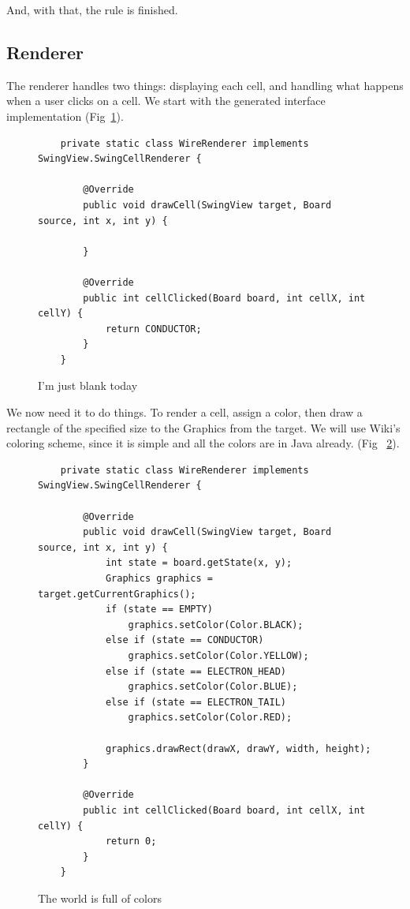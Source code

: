 \documentclass{report}
\begin{document}
And, with that, the rule is finished.


\subsection{Renderer}
The renderer handles two things: displaying each cell, and handling what happens
when a user clicks on a cell. We start with the generated interface
implementation  (Fig~\ref{code:blank}).
\begin{figure}[H]
\begin{lstlisting}
	private static class WireRenderer implements SwingView.SwingCellRenderer {

        @Override
        public void drawCell(SwingView target, Board source, int x, int y) {
        
        }

        @Override
        public int cellClicked(Board board, int cellX, int cellY) {
            return CONDUCTOR;
        }
    }
    \end{lstlisting}
\caption{I'm just blank today}
\label{code:blank}
\end{figure}


We now need it to do things.  To render a cell, assign a color, then draw a
rectangle of the specified size to the Graphics from the target. We will use Wiki's coloring scheme, since it is
simple and all the colors are in Java already. (Fig
~\ref{code:colored}).
\begin{figure}[H]
\begin{lstlisting}
	private static class WireRenderer implements SwingView.SwingCellRenderer {

        @Override
        public void drawCell(SwingView target, Board source, int x, int y) {
        	int state = board.getState(x, y);
            Graphics graphics = target.getCurrentGraphics();
            if (state == EMPTY)
                graphics.setColor(Color.BLACK);
            else if (state == CONDUCTOR)
                graphics.setColor(Color.YELLOW);
            else if (state == ELECTRON_HEAD)
                graphics.setColor(Color.BLUE);
            else if (state == ELECTRON_TAIL)
                graphics.setColor(Color.RED);
            
            graphics.drawRect(drawX, drawY, width, height);
        }

        @Override
        public int cellClicked(Board board, int cellX, int cellY) {
            return 0;
        }
    }
    \end{lstlisting}
\caption{The world is full of colors}
\label{code:colored}
\end{figure}
\end{document}
